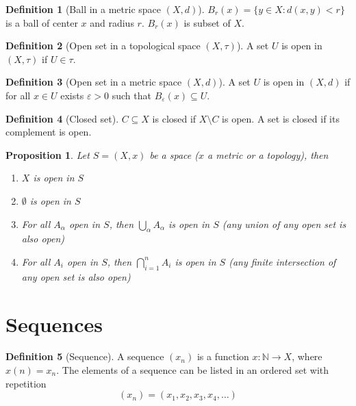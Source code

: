 \documentclass{article}
\newenvironment{enumrom}{\begin{enumerate}[label=(\roman*)]}{\end{enumerate}}
\newcommand{\f}[3]{#1 : #2 \rightarrow #3}
\theoremstyle{definition}
\newtheorem{definition}{Definition}[section]
\theoremstyle{definition}
\theoremstyle{plain}
\theoremstyle{plain}
\theoremstyle{plain}
\theoremstyle{plain}
\newtheorem{proposition}[theorem]{Proposition}
\theoremstyle{definition}
\theoremstyle{remark}
\theoremstyle{remark}
\theoremstyle{remark}
\theoremstyle{remark}
\newcommand{\N}{\mathbb{N}}
\newcommand{\E}{\varepsilon}
\begin{document}
\begin{definition}[Ball in a metric space $(X, d)$]
  $B_r(x) = \{ y \in X : d(x,y) < r \}$ is a ball of center $x$ and radius $r$. $B_r(x)$ is subset of $X$.
\end{definition}


\begin{definition}[Open set in a topological space $(X, \tau)$]
  A set $U$ is open in $(X, \tau)$ if $U \in \tau$.
\end{definition}


\begin{definition}[Open set in a metric space $(X, d)$]
  A set $U$ is open in $(X, d)$ if for all $x \in U$ exists $\E > 0$ such that $B_\E(x) \subseteq U$.
\end{definition}


\begin{definition}[Closed set]
  $C \subseteq X$ is closed if $X\setminus C$ is open. A set is closed if its complement is open.
\end{definition}


\begin{proposition}
  Let $S = (X, x)$ be a space ($x$ a metric or a topology), then
  \begin{enumrom}
  \item $X$ is open in $S$
  \item $\emptyset$ is open in $S$
  \item For all $A_\alpha$ open in $S$, then $\displaystyle \bigcup_\alpha A_\alpha$ is open in $S$ (any union of any open set is also open)
  \item For all $A_i$ open in $S$, then $\displaystyle \bigcap_{i=1}^n A_i$ is open in $S$ (any finite intersection of any open set is also open)
  \end{enumrom}
\end{proposition}


\section{Sequences}


\begin{definition}[Sequence]
  A sequence $(x_n)$ is a function $\f{x}{\N}{X}$, where $x(n) = x_n$. The elements of a sequence can be listed in an ordered set with repetition
  \[
  (x_n) = (x_1, x_2, x_3, x_4, \hdots)
  \]
\end{definition}
\end{document}
